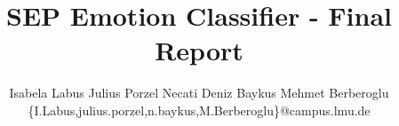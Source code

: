 \documentclass[10pt,twocolumn,letterpaper]{article}
\title{SEP Emotion Classifier - Final Report}
\author{Isabela Labus
\quad
Julius Porzel
\quad
Necati Deniz Baykus
\quad
Mehmet Berberoglu
\\
\texttt\small\{I.Labus,julius.porzel,n.baykus,M.Berberoglu\}@campus.lmu.de
}
\begin{document}
\maketitle







{
    \small
    
    
}

% 
\end{document}
